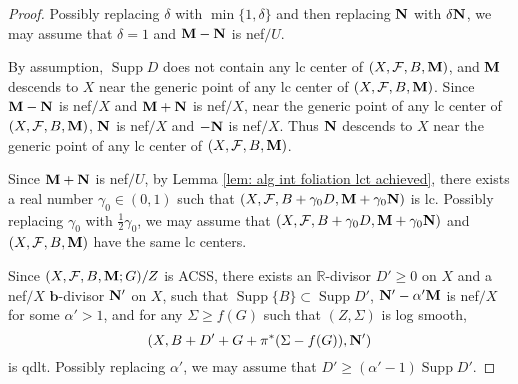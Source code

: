 \documentclass[11pt]{amsart}
\numberwithin{equation}{section}
\newcommand{\bb}{\bm{b}}
\newcommand{\Mm}{{\bf{M}}}
\newcommand{\Nn}{{\bf{N}}}
\newcommand{\Rr}{\mathbb{R}}
\newcommand{\Supp}{\operatorname{Supp}}
\newcommand{\Ff}{\mathcal{F}}
\theoremstyle{definition}
\theoremstyle{definition}
\theoremstyle{definition}
\begin{document}
\begin{proof}
Possibly replacing $\delta$ with $\min\{1,\delta\}$ and then replacing $\Nn$ with $\delta\Nn$, we may assume that $\delta=1$ and $\Mm-\Nn$ is nef$/U$.

By assumption, $\Supp D$ does not contain any lc center of $(X,\Ff,B,\Mm)$, and $\Mm$ descends to $X$ near the generic point of any lc center of $(X,\Ff,B,\Mm)$. Since $\Mm-\Nn$ is nef$/X$ and $\Mm+\Nn$ is nef$/X$, near the generic point of any lc center of $(X,\Ff,B,\Mm)$, $\Nn$ is nef$/X$ and $-\Nn$ is nef$/X$. Thus $\Nn$ descends to $X$ near the generic point of any lc center of $(X,\Ff,B,\Mm)$.

Since $\Mm+\Nn$ is nef$/U$, by Lemma \ref{lem: alg int foliation lct achieved}, there exists a real number $\gamma_0\in (0,1)$ such that $(X,\Ff,B+\gamma_0 D,\Mm+\gamma_0\Nn)$ is lc. Possibly replacing $\gamma_0$ with $\frac{1}{2}\gamma_0$, we may assume that $(X,\Ff,B+\gamma_0 D,\Mm+\gamma_0\Nn)$ and $(X,\Ff,B,\Mm)$ have the same lc centers. 

Since $(X,\Ff,B,\Mm;G)/Z$ is ACSS, there exists an $\Rr$-divisor $D'\geq 0$ on $X$ and a nef$/X$ $\bb$-divisor $\Nn'$ on $X$, such that $\Supp\{B\}\subset\Supp D'$, $\Nn'-\alpha'\Mm$ is nef$/X$ for some $\alpha'>1$, and for any $\Sigma\geq f(G)$ such that $(Z,\Sigma)$ is log smooth, 
$$(X,B+D'+G+\pi^*(\Sigma-f(G)),\Nn')$$ 
is qdlt. Possibly replacing $\alpha'$, we may assume that $D'\geq (\alpha'-1)\Supp D'$.


\end{proof}
\end{document}
